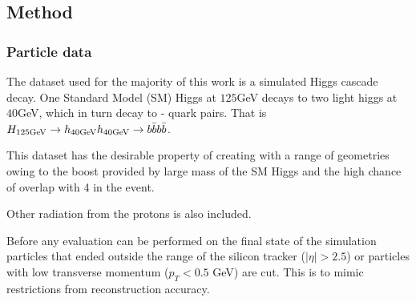 \subsection{Method}
\subsubsection{Particle data}
The dataset used for the majority of this work is a simulated Higgs cascade decay.
One Standard Model (SM) Higgs at \(125\)GeV decays to two light higgs at \(40\)GeV,
which in turn decay to \beau{}-\bbar{} quark pairs.
That is \(H_{125\text{GeV}} \rightarrow h_{40\text{GeV}} h_{40\text{GeV}} \rightarrow b \bar{b} b \bar{b}\).


This dataset has the desirable property of creating  with a range of geometries
owing to the boost provided by large mass of the SM Higgs and
the high chance of overlap with 4  in the event.

Other radiation from the protons is also included.  %


Before any evaluation can be performed on the final state of the simulation
particles that ended outside the range of the silicon tracker (\(|\eta|>2.5\))
or particles with low transverse momentum (\(p_T < 0.5\) GeV) are cut.
This is to mimic restrictions from reconstruction accuracy.

